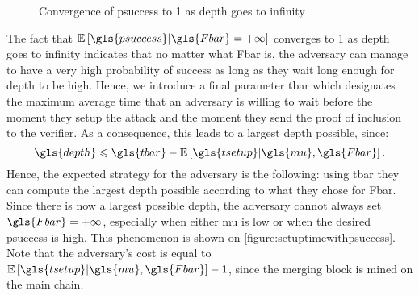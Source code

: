 \begin{figure}[ht]
    \centering
    \caption{Convergence of \gls{psuccess} to 1 as \gls{depth} goes to infinity}
    \label{figure:nmmimpact}
\end{figure}

The fact that \(\ES{\gls{psuccess}}{\gls{Fbar}=+\infty}\) converges to 1 as \gls{depth} goes to infinity indicates that no matter what \gls{Fbar} is, the adversary can manage to have a very high probability of success as long as they wait long enough for \gls{depth} to be high. Hence, we introduce a final parameter \gls{tbar} which designates the maximum average time that an adversary is willing to wait before the moment they setup the attack and the moment they send the proof of inclusion to the verifier. As a consequence, this leads to a largest \gls{depth} possible, since:
\[\gls{depth}\leqslant\gls{tbar}-\ES{\gls{tsetup}}{\gls{mu}, \gls{Fbar}}.\]
Hence, the expected strategy for the adversary is the following: using \gls{tbar} they can compute the largest \gls{depth} possible according to what they chose for \gls{Fbar}. Since there is now a largest possible \gls{depth}, the adversary cannot always set \(\gls{Fbar}=+\infty\), especially when either \gls{mu} is low or when the desired \gls{psuccess} is high. This phenomenon is shown on \autoref{figure:setuptimewithpsuccess}. Note that the adversary's cost is equal to \(\ES{\gls{tsetup}}{\gls{mu},\gls{Fbar}} - 1\), since the merging block is mined on the main chain.

